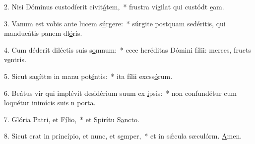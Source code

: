 2. Nisi Dóminus custodíerit civit\uline{á}tem,~* frustra vígilat qui custódt \uline{e}am.\par 
3. Vanum est vobis ante lucem s\uline{ú}rgere:~* súrgite postquam sedéritis, qui manducátis panem dl\uline{ó}ris.\par 
4. Cum déderit diléctis suis s\uline{o}mnum:~* ecce heréditas Dómini fílii: merces, fructs v\uline{e}ntris.\par 
5. Sicut sagíttæ in manu pot\uline{é}ntis:~* ita fílii excss\uline{ó}rum.\par 
6. Beátus vir qui implévit desidérium suum ex \uline{i}psis:~* non confundétur cum loquétur inimícis suis n p\uline{o}rta.\par 
7. Glória Patri, et F\uline{í}lio,~* et Spirítu S\uline{a}ncto.\par 
8. Sicut erat in princípio, et nunc, et s\uline{e}mper,~* et in sǽcula sæculórm. \uline{A}men.\par 
